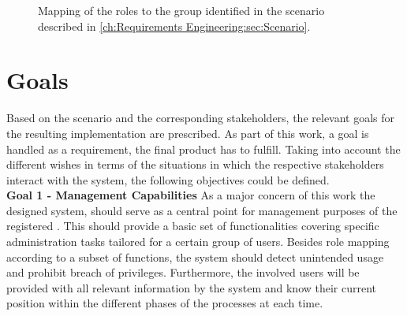 \begin{figure}[h]
    \centering
    \caption{Mapping of the roles to the group identified in the scenario described in \ref{ch:Requirements Engineering:sec:Scenario}.}
    \label{fig:role-mapping}
\end{figure}

\section{Goals}
\label{ch:Requirements Engineering:sec:Goals}

Based on the scenario and the corresponding stakeholders, the relevant goals for the resulting implementation are prescribed. As part of this work, a goal is handled as a requirement, the final product has to fulfill. 
Taking into account the different wishes in terms of the situations in which the respective stakeholders interact with the system, the following objectives could be defined. \\

\noindent \textbf{Goal 1 - Management Capabilities} As a major concern of this work the designed system, should serve as a central point for management purposes of the registered . This should provide a basic set of functionalities covering specific administration tasks tailored for a certain group of users. 
Besides role mapping according to a subset of functions, the system should detect unintended usage and prohibit breach of privileges.
Furthermore, the involved users will be provided with all relevant information by the system and know their current position within the different phases of the processes at each time. \\

